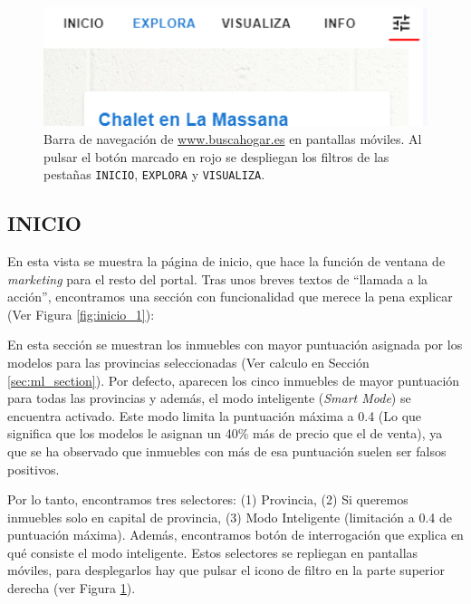 \begin{figure}[ht]
    \centering
	\includegraphics[width=1\textwidth]{img/filtro_replegado_1.PNG}
	\caption[Barra de navegación de \url{www.buscahogar.es} en pantallas móviles]{Barra de navegación de \url{www.buscahogar.es} en pantallas móviles. Al pulsar el botón marcado en rojo se despliegan los filtros de las pestañas \texttt{INICIO}, \texttt{EXPLORA} y \texttt{VISUALIZA}.}
	\label{fig:filtro_moviles}
\end{figure}

\clearpage
\subsection{INICIO}{\label{sec:web_inicio}}

En esta vista se muestra la página de inicio, que hace la función de ventana de \textit{marketing} para el resto del portal. Tras unos breves textos de ``llamada a la acción'', encontramos una sección con funcionalidad que merece la pena explicar (Ver Figura \ref{fig:inicio_1}): 

En esta sección se muestran los inmuebles con mayor puntuación asignada por los modelos para las provincias seleccionadas (Ver calculo en Sección \ref{sec:ml_section}). Por defecto, aparecen los cinco inmuebles de mayor puntuación para todas las provincias y además, el modo inteligente (\textit{Smart Mode}) se encuentra  activado. Este modo limita la puntuación máxima a 0.4 (Lo que significa que los modelos le asignan un 40\% más de precio que el de venta), ya que se ha observado que inmuebles con más de esa puntuación suelen ser falsos positivos.

Por lo tanto, encontramos tres selectores: (1) Provincia, (2) Si queremos inmuebles solo en capital de provincia, (3) Modo Inteligente (limitación a 0.4 de puntuación máxima). Además, encontramos botón de interrogación que explica en qué consiste el modo inteligente. Estos selectores se repliegan en pantallas móviles, para desplegarlos hay que pulsar el icono de filtro en la parte superior derecha (ver Figura \ref{fig:filtro_moviles}).


